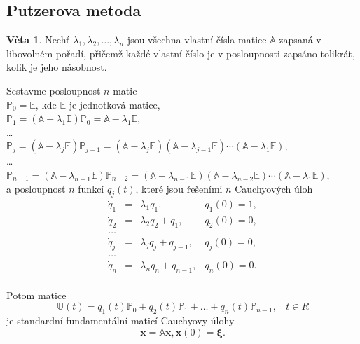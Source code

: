 \documentclass[a4paper, 12pt]{book}
\theoremstyle{definition}
\newtheorem{theorem}{Věta}[section]
\def\vc#1{\mathbf{\boldsymbol{#1}}}     %
\def\tn#1{{\mathbb{#1}}}    %
\begin{document}
\subsection{Putzerova metoda}
\begin{theorem}
Nechť $\lambda_1, \lambda_2,\dots,\lambda_n$ jsou všechna vlastní čísla matice 
$\tn A$ zapsaná v libovolném pořadí, přičemž každé vlastní číslo je 
v posloupnosti zapsáno tolikrát, kolik je jeho násobnost.

Sestavme posloupnost $n$ matic\\
${\tn P}_0 = {\tn E}$, kde $\tn E$ je jednotková matice,\\
${\tn P}_1 = ({\tn A}- \lambda_1{\tn E}){\tn P}_0 = {\tn A}- \lambda_1{\tn E}$,\\
\dots\\
${\tn P}_j = ({\tn A}- \lambda_j{\tn E}){\tn P}_{j-1} = ({\tn A}- \lambda_j{\tn E})({\tn A}- \lambda_{j-1}{\tn E})\cdots({\tn A}- \lambda_1{\tn E})$,\\
\dots\\
${\tn P}_{n-1} = ({\tn A}- \lambda_{n-1}{\tn E}){\tn P}_{n-2} = ({\tn A}- \lambda_{n-1}{\tn E})({\tn A}- \lambda_{n-2}{\tn E})\cdots({\tn A}- \lambda_1{\tn E})$,\\
a posloupnost $n$ funkcí $q_j(t)$, které jsou řešeními $n$ Cauchyových úloh
\begin{equation}
\begin{array}{rcll}
\dot q_1&=&\lambda_1q_1,&q_1(0)=1,\\
\dot q_2&=&\lambda_2q_2+q_1,&q_2(0)=0,\\
\dots\\
\dot q_j&=&\lambda_jq_j+q_{j-1},&q_j(0)=0,\\
\dots\\
\dot q_n&=&\lambda_nq_n+q_{n-1},&q_n(0)=0.\\
\end{array}
\end{equation}

Potom matice
\begin{equation}
{\tn U}(t) = q_1(t){\tn P}_0+q_2(t){\tn P}_1+\dots+q_n(t){\tn P}_{n-1}, ~~~~t\in R
\end{equation}
je standardní fundamentální maticí Cauchyovy úlohy
\begin{equation}\label{4.2.5}
\dot{\vc x} = {\tn A}\vc x, \vc x(0)=\vc\xi.
\end{equation}
\end{theorem}
\end{document}
